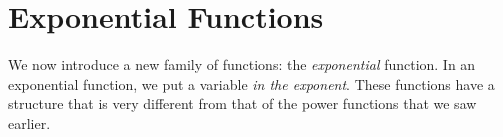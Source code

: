 \section{Exponential Functions}
We now introduce a new family of functions: the \emph{exponential} function. In an exponential function, we put a variable \emph{in the exponent}. These functions have a structure that is very different from that of the power functions that we saw earlier.

 
% 
 
 
 
 

